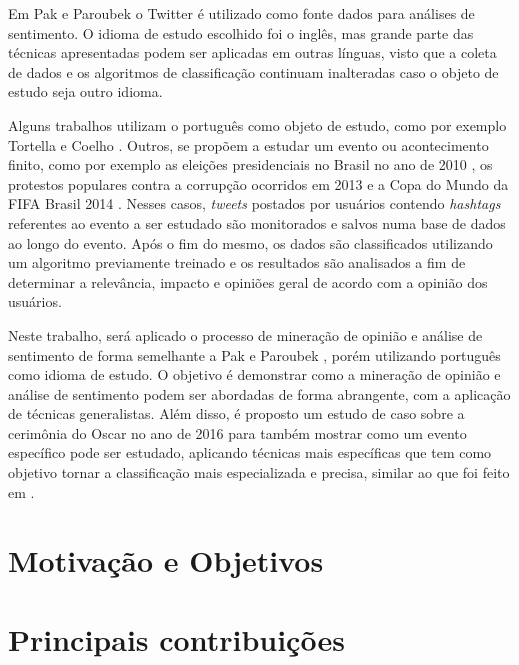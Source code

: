 Em Pak e Paroubek \cite{pak2010twitter} o Twitter é utilizado como fonte dados para análises de sentimento. O idioma de estudo escolhido foi o inglês, mas grande parte das técnicas apresentadas podem ser aplicadas em outras línguas, visto que a coleta de dados e os algoritmos de classificação continuam inalteradas caso o objeto de estudo seja outro idioma.

Alguns trabalhos utilizam o português como objeto de estudo, como por exemplo Tortella e Coelho \cite{tortellaanalise}. Outros, se propõem a estudar um evento ou acontecimento finito, como por exemplo as eleições presidenciais no Brasil no ano de 2010 \cite{rodrigues2012characterizing}, os protestos populares contra a corrupção ocorridos em 2013 \cite{franca2014analise} e a Copa do Mundo da FIFA Brasil 2014 \cite{carvalho2014mineraccao}. Nesses casos, \textit{tweets} postados por usuários contendo \textit{hashtags} referentes ao evento a ser estudado são monitorados e salvos numa base de dados ao longo do evento. Após o fim do mesmo, os dados são classificados utilizando um algoritmo previamente treinado e os resultados são analisados a fim de determinar a relevância, impacto e opiniões geral de acordo com a opinião dos usuários.

Neste trabalho, será aplicado o processo de mineração de opinião e análise de sentimento de forma semelhante a Pak e Paroubek \cite{pak2010twitter}, porém utilizando português como idioma de estudo. O objetivo é demonstrar como a mineração de opinião e análise de sentimento podem ser abordadas de forma abrangente, com a aplicação de técnicas generalistas. Além disso, é proposto um estudo de caso sobre a cerimônia do Oscar no ano de 2016 para também mostrar como um evento específico pode ser estudado, aplicando técnicas mais específicas que tem como objetivo tornar a classificação mais especializada e precisa, similar ao que foi feito em \cite{rodrigues2012characterizing} \cite{franca2014analise} \cite{carvalho2014mineraccao}.


\section{Motivação e Objetivos}\label{sec:1_inicio}



\section{Principais contribuições}\label{sec:1_principais_contribuicoes}

